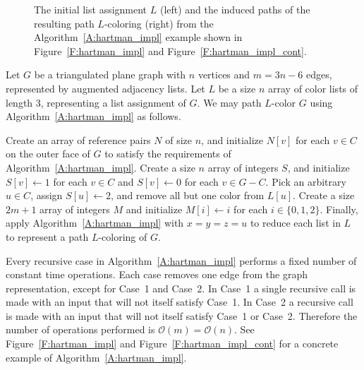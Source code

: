 \documentclass[12pt,letterpaper]{article}
\theoremstyle{plain}
\theoremstyle{definition}
\theoremstyle{break}
\begin{document}
\begin{figure}
\begin{center}
\caption{The initial list assignment $L$ (left) and the induced paths of the
resulting path
$L$-coloring (right)
from the Algorithm~\ref{A:hartman_impl} example shown in
Figure~\ref{F:hartman_impl} and Figure~\ref{F:hartman_impl_cont}.}
\label{F:hartman_impl_comp}
\end{center}
\end{figure}

Let $G$ be a triangulated plane graph with $n$ vertices and $m=3n-6$ edges,
represented by augmented adjacency
lists. Let $L$ be a size $n$ array of color lists of length $3$,
representing a list assignment of $G$. We may path $L$-color $G$ using
Algorithm~\ref{A:hartman_impl} as follows.

Create an array of reference pairs $N$ of size $n$, and initialize $N[v]$
for each $v\in C$ on the outer face of $G$ to satisfy
the requirements of Algorithm~\ref{A:hartman_impl}. Create a size $n$ array of
integers $S$, and initialize $S[v]\leftarrow 1$ for each $v\in C$ and
$S[v]\leftarrow 0$ for each $v\in G-C$. Pick an arbitrary $u\in C$,
assign $S[u]\leftarrow 2$, and remove all but one color from $L[u]$.
Create a size $2m+1$
array of integers $M$ and initialize $M[i]\leftarrow i$ for each
$i\in\{0,1,2\}$.
Finally, apply
Algorithm~\ref{A:hartman_impl} with $x=y=z=u$ to reduce each list in $L$ to
represent a path $L$-coloring of $G$.

Every recursive case in Algorithm~\ref{A:hartman_impl} performs a fixed number
of constant time operations. Each case removes one edge from the graph
representation,
except for Case~1 and Case~2. In Case~1 a single recursive call is made
with an input that will not itself satisfy Case~1. In Case~2 a recursive
call is made with an input that will not itself satisfy Case~1 or Case~2.
Therefore the number of operations performed
is $\mathcal{O}(m)=\mathcal{O}(n)$. See Figure~\ref{F:hartman_impl} and
Figure~\ref{F:hartman_impl_cont} for a concrete example of
Algorithm~\ref{A:hartman_impl}.
\end{document}
